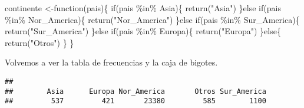 \documentclass[]{article}
\newenvironment{Shaded}{\begin{snugshade}}{\end{snugshade}}
\newcommand{\ControlFlowTok}[1]{\textcolor[rgb]{0.94,0.87,0.69}{#1}}
\newcommand{\DataTypeTok}[1]{\textcolor[rgb]{0.87,0.87,0.75}{#1}}
\newcommand{\KeywordTok}[1]{\textcolor[rgb]{0.94,0.87,0.69}{#1}}
\newcommand{\NormalTok}[1]{\textcolor[rgb]{0.80,0.80,0.80}{#1}}
\newcommand{\OperatorTok}[1]{\textcolor[rgb]{0.94,0.94,0.82}{#1}}
\newcommand{\StringTok}[1]{\textcolor[rgb]{0.80,0.58,0.58}{#1}}
\begin{document}
\begin{Shaded}
\begin{Highlighting}[]
\NormalTok{continente \textless{}{-}}\ControlFlowTok{function}\NormalTok{(pais)\{}
    \ControlFlowTok{if}\NormalTok{(pais }\OperatorTok{\%in\%}\StringTok{ }\NormalTok{Asia)\{}
      \KeywordTok{return}\NormalTok{(}\StringTok{"Asia"}\NormalTok{)}
\NormalTok{    \}}\ControlFlowTok{else} \ControlFlowTok{if}\NormalTok{(pais }\OperatorTok{\%in\%}\StringTok{ }\NormalTok{Nor\_America)\{}
      \KeywordTok{return}\NormalTok{(}\StringTok{"Nor\_America"}\NormalTok{)}
\NormalTok{    \}}\ControlFlowTok{else} \ControlFlowTok{if}\NormalTok{(pais }\OperatorTok{\%in\%}\StringTok{ }\NormalTok{Sur\_America)\{}
      \KeywordTok{return}\NormalTok{(}\StringTok{"Sur\_America"}\NormalTok{)}
\NormalTok{    \}}\ControlFlowTok{else} \ControlFlowTok{if}\NormalTok{(pais }\OperatorTok{\%in\%}\StringTok{ }\NormalTok{Europa)\{}
      \KeywordTok{return}\NormalTok{(}\StringTok{"Europa"}\NormalTok{)}
\NormalTok{    \}}\ControlFlowTok{else}\NormalTok{\{}
      \KeywordTok{return}\NormalTok{(}\StringTok{"Otros"}\NormalTok{)}
\NormalTok{    \}}
\NormalTok{\}}
\end{Highlighting}
\end{Shaded}

\begin{Shaded}
\end{Shaded}

Volvemos a ver la tabla de frecuencias y la caja de bigotes.

\begin{Shaded}
\end{Shaded}

\begin{verbatim}
## 
##        Asia      Europa Nor_America       Otros Sur_America 
##         537         421       23380         585        1100
\end{verbatim}
\end{document}
